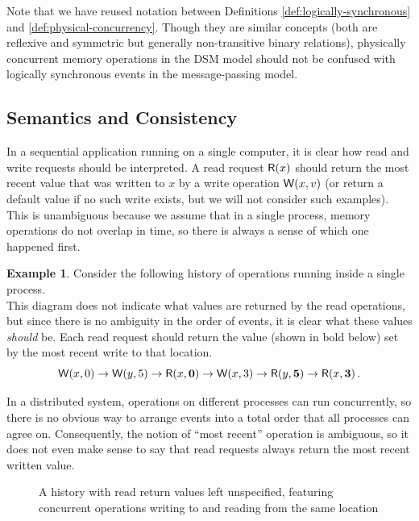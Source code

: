 \documentclass[]             %
{NASA}                       %
\theoremstyle{definition}
\newtheorem{example}[theorem]{Example}
\begin{document}
Note that we have reused notation between Definitions
\ref{def:logically-synchronous} and \ref{def:physical-concurrency}.
Though they are similar concepts (both are reflexive and symmetric but
generally non-transitive binary relations), physically concurrent
memory operations in the DSM model should not be confused with
logically synchronous events in the message-passing model.

\subsection{Semantics and Consistency}
In a sequential application running on a single computer, it is clear
how read and write requests should be interpreted. A read request
$\mathsf{R}\!\left(x\right)$ should return the most recent value that was written to
$x$ by a write operation $\mathsf{W}\!\left(x, v\right)$ (or return a default value
if no such write exists, but we will not consider such examples). This
is unambiguous because we assume that in a single process, memory
operations do not overlap in time, so there is always a sense of which
one happened first.

\begin{example}
  Consider the following history of operations running inside a single process.
  \[\]
  This diagram does not indicate what values are returned by the read
  operations, but since there is no ambiguity in the order of events,
  it is clear what these values \emph{should} be. Each read request
  should return the value (shown in bold below) set by the most recent
  write to that location.
  \[ \mathsf{W}\!\left(x, 0\right) \to \mathsf{W}\!\left(y, 5\right) \to \mathsf{R}\!\left(x, \textbf{0}\right) \to \mathsf{W}\!\left(x, 3\right) \to \mathsf{R}\!\left(y, \textbf{5}\right) \to \mathsf{R}\!\left(x, \textbf{3}\right). \]
\end{example}

In a distributed system, operations on different processes can run
concurrently, so there is no obvious way to arrange events into a
total order that all processes can agree on. Consequently, the notion
of ``most recent'' operation is ambiguous, so it does not even make
sense to say that read requests always return the most recent written
value.

\begin{figure}[h]
  
  \caption{A history with read return values left unspecified,
    featuring concurrent operations writing to and reading from the
    same location}
  \label{fig:dsm-example-2}
\end{figure}
\end{document}
